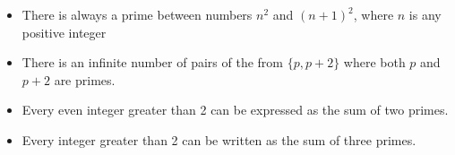 \begin{itemize}
\item There is always a prime between numbers $n^2$ and $(n+1)^2$, where $n$ is any positive integer
\item There is an infinite number of pairs of the from $\{p, p + 2\}$ where both $p$ and $p + 2$ are primes.
\item Every even integer greater than 2 can be expressed as the sum of two primes.
\item Every integer greater than 2 can be written as the sum of three primes.
\end{itemize}
